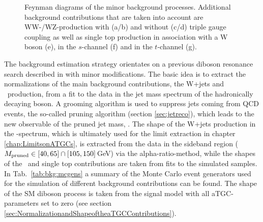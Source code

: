 \begin{figure}[h!]
	\centering
	\caption[Feynman diagrams of the minor background processes]{Feynman diagrams of the minor background processes. Additional background contributions that are taken into account are WW-/WZ-production with (a/b) and without (c/d) triple gauge coupling as well as single top production in association with a W boson (e), in the $s$-channel (f) and in the $t$-channel (g).}
\end{figure}

\noindent The background estimation strategy orientates on a previous diboson resonance search described in \cite{resonancepas} with minor modifications. The basic idea is to extract the normalizations of the main background contributions, the W+jets and \ttbar \ production, from a fit to the data in the jet mass spectrum of the hadronically decaying boson. A grooming algorithm is used to suppress jets coming from QCD events, the so-called pruning algorithm (section \ref{sec:jetreco}), which leads to the new observable of the pruned jet mass, \Mpr . The shape of the W+jets production in the \MWV -spectrum, which is ultimately used for the limit extraction in chapter \ref{chap:LimitsonATGCs}, is extracted from the data in the sideband region ($M_\mathrm{pruned} \in [40,65] \cap [105,150]$\,GeV) via the alpha-ratio-method, while the shapes of the \ttbar \ and single top contributions are taken from fits to the simulated samples. In Tab.~\ref{tab:bkg:mcgens} a summary of the Monte Carlo event generators used for the simulation of different background contributions can be found. The shape of the SM diboson process is taken from the signal model with all aTGC-parameters set to zero (see section \ref{sec:NormalizationandShapeoftheaTGCContributions}).\\

